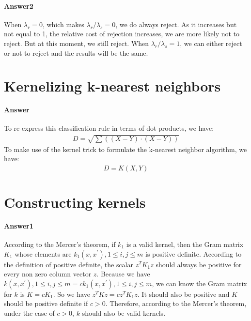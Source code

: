 \documentclass[paper=a4, fontsize=11pt]{scrartcl} %
\numberwithin{equation}{section} %
\numberwithin{figure}{section} %
\numberwithin{table}{section} %
\begin{document}
\paragraph{\textbf{Answer2}}
When $\lambda _{r}=0$, which makes $\lambda _{r}/\lambda _{s}=0$, we do always reject. As it increases but not equal to 1, the relative cost of rejection increases, we are more likely not to reject. But at this moment, we still reject. When $\lambda _{r}/\lambda _{s}=1$, we can either reject or not to reject and the results will be the same.

\section{Kernelizing k-nearest neighbors}

\paragraph{\textbf{Answer}}
To re-express this classification rule in terms of dot products, we have:
\begin{align*}
D=\sqrt{\sum \left ( \left ( X-Y \right )\cdot \left ( X-Y \right ) \right )}
\end{align*}
To make use of the kernel trick to formulate the k-nearest neighbor algorithm, we have:
\begin{align*}
D=K\left ( X,Y \right )
\end{align*}

\section{Constructing kernels}

\paragraph{\textbf{Answer1}}
According to the Mercer's theorem, if $k_{1}$ is a valid kernel, then the Gram matrix $K_{1}$ whose elements are $k_{1}\left ( x, x^{'} \right ),1\leq i,j\leq m$ is positive definite. According to the definition of positive definite, the scalar $z^{T}K_{1}z$ should always be positive for every non zero column vector $z$. Because we have $k\left ( x, x^{'} \right ),1\leq i,j\leq m=ck_{1}\left ( x, x^{'} \right ),1\leq i,j\leq m$, we can know the Gram matrix for $k$ is $K=cK_{1}$. So we have $z^{T}Kz=cz^{T}K_{1}z$. It should also be positive and $K$ should be positive definite if $c>0$. Therefore, according to the Mercer's theorem, under the case of $c>0$, $k$ should also be valid kernels.
\end{document}
